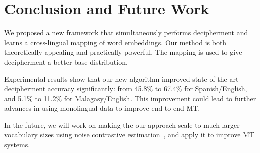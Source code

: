 \section{Conclusion and Future Work}


We proposed a new framework that simultaneously performs decipherment and learns a cross-lingual mapping of word embeddings. Our method is both theoretically appealing and practically powerful. The mapping is used to give decipherment a better base distribution. 

Experimental results show that our new algorithm improved state-of-the-art decipherment accuracy significantly: from 45.8\% to 67.4\% for Spanish/English, and 5.1\% to 11.2\% for Malagasy/English. This improvement could lead to further advances in using monolingual data to improve end-to-end MT.

In the future, we will work on making the our approach scale to much larger vocabulary sizes using noise contrastive estimation~\cite{gutmann2010noise}, and apply it to improve MT systems.